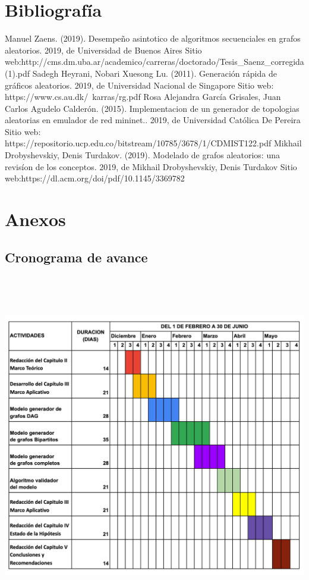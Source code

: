 \documentclass[11pt]{extarticle}
\begin{document}
\section{Bibliograf\'ia}
  Manuel Zaens. (2019). Desempeño asintotico de algoritmos secuenciales en grafos aleatorios. 2019, de Universidad de Buenos Aires Sitio web:\hfill\break http://cms.dm.uba.ar/academico/carreras/doctorado/Tesis\_Saenz\_corregida(1).pdf \hfill \break
  \break
  Sadegh Heyrani, Nobari Xuesong Lu. (2011). Generaci\'on r\'apida de gr\'aficos aleatorios. 2019, de Universidad Nacional de Singapore Sitio web: https://www.cs.au.dk/~karras/rg.pdf
  \break
  \break
  Rosa Alejandra Garc\'ia Grisales, Juan Carlos Agudelo Calder\'on. (2015). Implementacion de un generador de topologias aleatorias en emulador de red mininet.. 2019, de Universidad Cat\'olica De Pereira Sitio web: https://repositorio.ucp.edu.co/bitstream/10785/3678/1/CDMIST122.pdf
  \break
  \break
  Mikhail Drobyshevskiy, Denis Turdakov. (2019). Modelado de grafos aleatorios: una revis\'ion de los conceptos. 2019, de Mikhail Drobyshevskiy, Denis Turdakov Sitio web:\hfill\break https://dl.acm.org/doi/pdf/10.1145/3369782
\section{Anexos}
\subsection{Cronograma de avance}
\includegraphics[width=18cm,height=15cm]{calendario.png}
\end{document}
